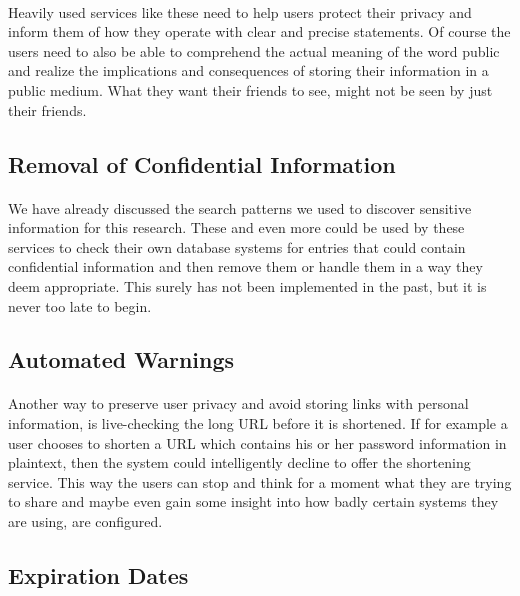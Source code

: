 \documentclass[12pt]{article}
\begin{document}
\paragraph{}
 Heavily used services like these need to help users protect their privacy and inform them of how they operate with clear and precise statements. Of course the users need to also be able to comprehend the actual meaning of the word public and realize the implications and consequences of storing their information in a public medium. What they want their friends to see, might not be seen by just their friends.

\subsection{Removal of Confidential Information}

\paragraph{}
 We have already discussed the search patterns we used to discover sensitive information for this research. These and even more could be used by these services to check their own database systems for entries that could contain confidential information and then remove them or handle them in a way they deem appropriate. This surely has not been implemented in the past, but it is never too late to begin.

\subsection{Automated Warnings}

\paragraph{}
Another way to preserve user privacy and avoid storing links with personal information, is live-checking the long URL before it is shortened. If for example a user chooses to shorten a URL which contains his or her password information in plaintext, then the system could intelligently decline to offer the shortening service. This way the users can stop and think for a moment what they are trying to share and maybe even gain some insight into how badly certain systems they are using, are configured.

\subsection{Expiration Dates}
\end{document}
